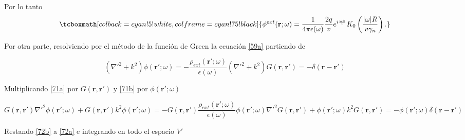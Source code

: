 \documentclass[a4paper,10pt]{article}
\begin{document}
Por lo tanto
\begin{equation}
\tcboxmath[colback=cyan!5!white,colframe=cyan!75!black]{
\phi^{ext}(\textbf{r};\omega)=\frac{1}{4\pi\epsilon(\omega)}\frac{2q}{v}e^{i\frac{\omega z}{v}}K_0\left( \frac{|\omega|R}{v\gamma_n} \right).}
\label{PotencialExt1}
\end{equation}

Por otra parte, resolviendo por el método de la función de Green la ecuación \eqref{59a} partiendo de

\begin{subequations}
\begin{equation}
(\nabla'^2+k^2)\phi(\textbf{r}';\omega)=-	\frac{\rho_{ext}(\textbf{r}';\omega)}{\epsilon(\omega)}
\label{71a}
\end{equation}
\begin{equation}
(\nabla'^2+k^2)G(\textbf{r},\textbf{r}')=-\delta(\textbf{r}-\textbf{r}')
\label{71b}
\end{equation}
\end{subequations}

Multiplicando \eqref{71a} por $G(\textbf{r},\textbf{r}')$ y \eqref{71b} por $\phi(\textbf{r}';\omega)$

\begin{subequations}
\begin{equation}
G(\textbf{r},\textbf{r}')\nabla'^2\phi(\textbf{r}';\omega)+G(\textbf{r},\textbf{r}')k^2\phi(\textbf{r}';\omega)=-G(\textbf{r},\textbf{r}')\frac{\rho_{ext}(\textbf{r}';\omega)}{\epsilon(\omega)}
\label{72a}
\end{equation}
\begin{equation}
\phi(\textbf{r}';\omega)\nabla'^2G(\textbf{r},\textbf{r}')+\phi(\textbf{r}';\omega)k^2G(\textbf{r},\textbf{r}')=-\phi(\textbf{r}';\omega)\delta(\textbf{r}-\textbf{r}')
\label{72b}
\end{equation}
\end{subequations}

Restando \eqref{72b} a \eqref{72a} e integrando en todo el espacio $V'$
\end{document}
